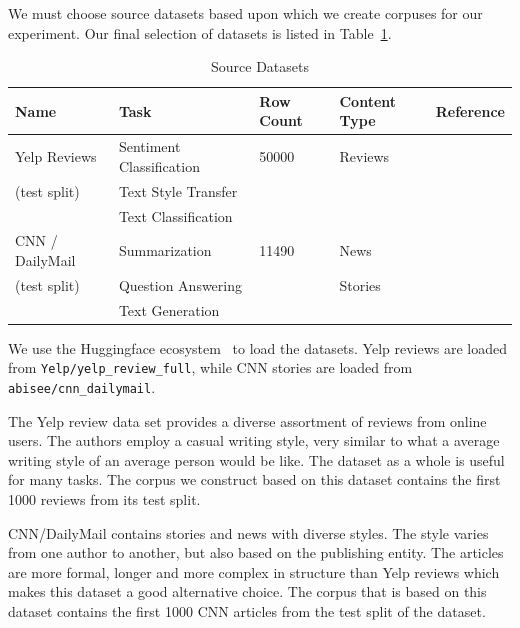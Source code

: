 \documentclass[runningheads,a4paper,11pt]{article}
\begin{document}
We must choose source datasets based upon which we create corpuses for our
experiment.
Our final selection of datasets is listed in Table~\ref{table-ds}.

\begin{table}[ht]
    \setlength\tabcolsep{6pt}
    \centering
    \begin{tabular}{@{}lllll@{}}
        \toprule
        Name              & Task                     & Row Count & Content Type & Reference              \\ \toprule
        Yelp Reviews      & Sentiment Classification & 50000     & Reviews      & \cite{yelp2015neurips} \\
        (test split)      & Text Style Transfer      &           &              &                        \\
                          & Text Classification      &           &              &                        \\ \midrule
        CNN / DailyMail   & Summarization            & 11490     & News         & \cite{cnndm2015}       \\
        (test split)      & Question Answering       &           & Stories      & \cite{cnndm2017}       \\
                          & Text Generation          &           &              &                        \\ \midrule
    \end{tabular}
    \caption{Source Datasets}\label{table-ds}
\end{table}

We use the Huggingface ecosystem~\cite{lhoest-etal-2021-datasets} to load the
datasets.
Yelp reviews are loaded from \texttt{Yelp/yelp\_review\_full}, while CNN stories
are loaded from \texttt{abisee/cnn\_dailymail}.

The Yelp review data set provides a diverse assortment of reviews from online
users.
The authors employ a casual writing style, very similar to what a average
writing style of an average person would be like.
The dataset as a whole is useful for many tasks.
The corpus we construct based on this dataset contains the first 1000 reviews
from its test split.

CNN/DailyMail contains stories and news with diverse styles.
The style varies from one author to another, but also based on the publishing
entity.
The articles are more formal, longer and more complex in structure than Yelp
reviews which makes this dataset a good alternative choice.
The corpus that is based on this dataset contains the first 1000 CNN articles
from the test split of the dataset.
\end{document}
